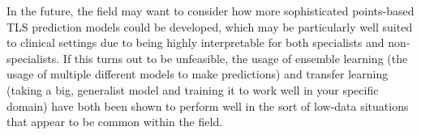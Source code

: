 \documentclass{article}
\begin{document}
In the future, the field may want to consider how more sophisticated points-based TLS prediction models could be developed, which may be particularly well suited to clinical settings due to being highly interpretable for both specialists and non-specialists. If this turns out to be unfeasible, the usage of ensemble learning (the usage of multiple different models to make predictions) and transfer learning (taking a big, generalist model and training it to work well in your specific domain) have both been shown to perform well in the sort of low-data situations that appear to be common within the field.


\newpage


\end{document}
